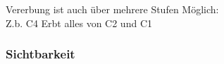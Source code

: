 \noindent
\begin{minipage}{0.6\columnwidth}
\begin{center}
\end{center}
\end{minipage}
\begin{minipage}{0.4\columnwidth}
    Vererbung ist auch über mehrere Stufen Möglich:\\
    Z.b. C4 Erbt alles von C2 und C1
\end{minipage}

\subsubsection{Sichtbarkeit}

